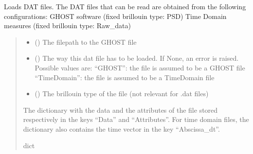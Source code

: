 \documentclass[letterpaper,10pt,english]{sphinxmanual}
\begin{document}
\begin{fulllineitems}
\label{\detokenize{_autosummary/HDF5_BLS.load_data:HDF5_BLS.load_data.load_dat_file}}
\pysigstartsignatures
\pysiglinewithargsret
{}
{\sphinxparamcomma {}\sphinxparamcomma {}\sphinxparamcomma {}}
{}
\pysigstopsignatures
\sphinxAtStartPar
Loads DAT files. The DAT files that can be read are obtained from the following configurations:
\sphinxhyphen{} GHOST software (fixed brillouin type: PSD)
\sphinxhyphen{} Time Domain measures (fixed brillouin type: Raw\_data)
\begin{quote}\begin{description}
\begin{itemize}
\item {} 
\sphinxAtStartPar
{} () \textendash{} The filepath to the GHOST file

\item {} 
\sphinxAtStartPar
{} (\sphinxstyleliteralemphasis{\sphinxupquote{, }}) \textendash{} The way this dat file has to be loaded. If None, an error is raised. Possible values are:
\sphinxhyphen{} “GHOST”: the file is assumed to be a GHOST file
\sphinxhyphen{} “TimeDomain”: the file is assumed to be a TimeDomain file

\item {} 
\sphinxAtStartPar
{} (\sphinxstyleliteralemphasis{\sphinxupquote{, }}) \textendash{} The brillouin type of the file (not relevant for .dat files)

\end{itemize}

\sphinxAtStartPar
The dictionary with the data and the attributes of the file stored respectively in the keys “Data” and “Attributes”. For time domain files, the dictionary also contains the time vector in the key “Abscissa\_dt”.

\sphinxAtStartPar
dict

\end{description}\end{quote}

\end{fulllineitems}
\end{document}
